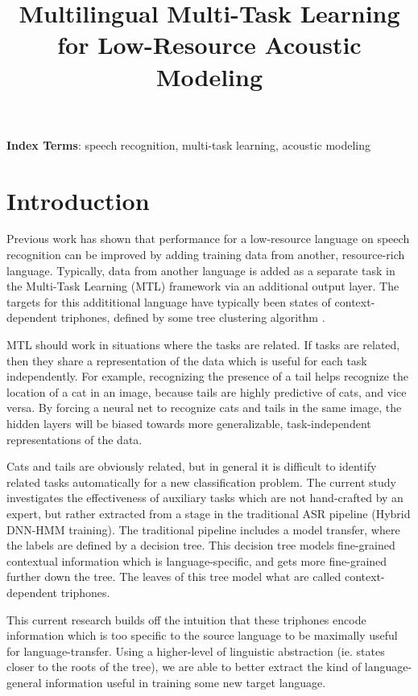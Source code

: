 \documentclass[a4paper]{article}
\title{Multilingual Multi-Task Learning for Low-Resource Acoustic Modeling}
\begin{document}
\maketitle
% 
\begin{abstract}
  
\end{abstract}
\noindent\textbf{Index Terms}: speech recognition, multi-task learning, acoustic modeling





\section{Introduction}

Previous work has shown that performance for a low-resource language on speech recognition can be improved by adding training data from another, resource-rich language. Typically, data from another language is added as a separate task in the Multi-Task Learning (MTL) framework  \cite{caruana1997} via an additional output layer. The targets for this addititional language have typically been states of context-dependent triphones, defined by some tree clustering algorithm \cite{huang2013,heigold2013,grezl2016}.

MTL should work in situations where the tasks are related. If tasks are related, then they share a representation of the data which is useful for each task independently. For example, recognizing the presence of a tail helps recognize the location of a cat in an image, because tails are highly predictive of cats, and vice versa. By forcing a neural net to recognize cats and tails in the same image, the hidden layers will be biased towards more generalizable, task-independent representations of the data.

Cats and tails are obviously related, but in general it is difficult to identify related tasks automatically for a new classification problem. The current study investigates the effectiveness of auxiliary tasks which are not hand-crafted by an expert, but rather extracted from a stage in the traditional ASR pipeline (Hybrid DNN-HMM training). The traditional pipeline includes a model transfer, where the labels are defined by a decision tree. This decision tree models fine-grained contextual information which is language-specific, and gets more fine-grained further down the tree. The leaves of this tree model what are called context-dependent triphones.

This current research builds off the intuition that these triphones encode information which is too specific to the source language to be maximally useful for language-transfer. Using a higher-level of linguistic abstraction (ie. states closer to the roots of the tree), we are able to better extract the kind of language-general information useful in training some new target language.
\end{document}
